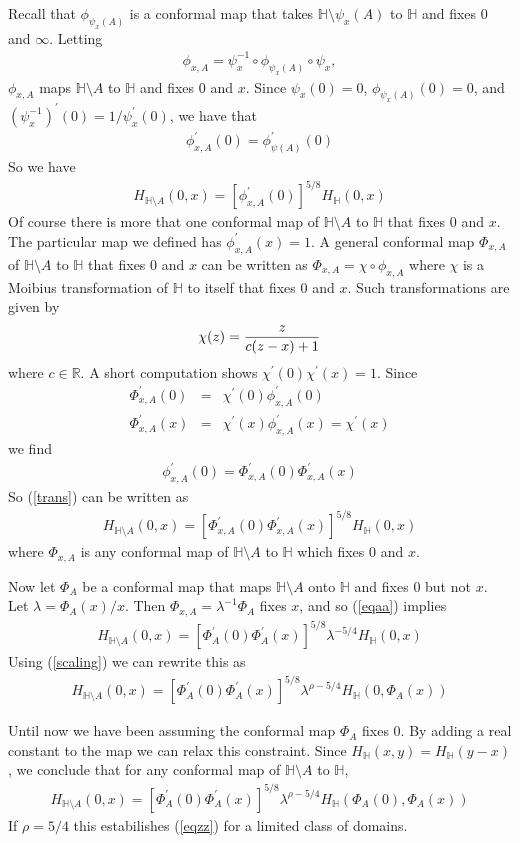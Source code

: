 \documentclass[12pt]{article}
\newcommand{\bea}{\begin{eqnarray}}
\newcommand{\eea}{\end{eqnarray}}
\newcommand{\beann}{\begin{eqnarray*}}
\newcommand{\eeann}{\end{eqnarray*}}
\def\reff#1{(\ref{#1})}
\def \Half {{\mathbb H}}
\def \reals {{\mathbb R}}
\begin{document}
Recall that $\phi_{\psi_x(A)}$ is a conformal map that takes 
$\Half \setminus \psi_x(A)$ to $\Half$ and fixes $0$ and $\infty$. 
Letting
\beann
\phi_{x,A}= \psi_x^{-1} \circ \phi_{\psi_x(A)} \circ \psi_x,
\eeann
$\phi_{x,A}$ maps $\Half \setminus A$ to $\Half$ and fixes $0$ 
and $x$. 
Since $\psi_x(0)=0$, $\phi_{\psi_x(A)}(0)=0$, and 
$(\psi_x^{-1})^\prime(0)=1/\psi_x^\prime(0)$, 
we have that 
\beann
\phi_{x,A}^\prime(0) = \phi_{\psi(A)}^\prime(0) 
\eeann
So we have
\bea
H_{\Half \setminus A} (0,x)  = [\phi_{x,A}^\prime(0)]^{5/8} H_\Half(0,x) 
\label{trans}
\eea
Of course there is more that one conformal map of $\Half \setminus A$
to $\Half$ that fixes $0$ and $x$. The particular map we defined has 
$\phi_{x,A}^\prime(x)=1$. 
A general conformal map $\Phi_{x,A}$ of $\Half \setminus A$
to $\Half$ that fixes $0$ and $x$ can be written as 
$\Phi_{x,A} = \chi \circ \phi_{x,A}$ 
where $\chi$ is a Moibius transformation of $\Half$ to itself that 
fixes $0$ and $x$. 
Such transformations are given by 
\beann 
\chi(z) = {z \over c(z-x)+1}
\eeann
where $c \in \reals$. 
A short computation shows $\chi^\prime(0) \chi^\prime(x)=1$. 
Since 
\beann
\Phi_{x,A}^\prime(0) &=& \chi^\prime(0) \phi_{x,A}^\prime(0) \\
\Phi_{x,A}^\prime(x) &=& \chi^\prime(x) \phi_{x,A}^\prime(x) = \chi^\prime(x) 
\eeann
we find
\beann
\phi_{x,A}^\prime(0) = \Phi_{x,A}^\prime(0)  \Phi_{x,A}^\prime(x)  
\eeann
So \reff{trans} can be written as 
\bea
H_{\Half \setminus A} (0,x)  = 
[\Phi_{x,A}^\prime(0) \Phi_{x,A}^\prime(x)]^{5/8} H_\Half(0,x) 
\label{eqaa}
\eea
where $\Phi_{x,A}$ is any conformal map of $\Half \setminus A$ to $\Half$ 
which fixes $0$ and $x$.


Now let $\Phi_A$ be a conformal map that maps $\Half \setminus A$
onto $\Half$ and fixes $0$ but not $x$. Let $\lambda=\Phi_A(x)/x$. 
Then $\Phi_{x,A} = \lambda^{-1} \Phi_A$ fixes $x$, and so \reff{eqaa}
implies
\beann
H_{\Half \setminus A} (0,x)  = 
[\Phi_A^\prime(0) \Phi_A^\prime(x)]^{5/8} \lambda^{-5/4} H_\Half(0,x) 
\label{eqbb}
\eeann
Using \reff{scaling} we can rewrite this as 
\bea
H_{\Half \setminus A} (0,x)  = 
[\Phi_A^\prime(0) \Phi_A^\prime(x)]^{5/8} \lambda^{\rho-5/4} 
H_\Half(0,\Phi_A(x)) 
\eea

Until now we have been assuming the conformal map $\Phi_A$ fixes $0$. 
By adding a real constant to the map we can relax this constraint. 
Since $H_\Half(x,y) = H_\Half(y-x)$, we conclude that for any 
conformal map of $\Half \setminus A$ to $\Half$, 
\bea
H_{\Half \setminus A} (0,x)  = 
[\Phi_A^\prime(0) \Phi_A^\prime(x)]^{5/8} \lambda^{\rho-5/4} 
H_\Half(\Phi_A(0),\Phi_A(x)) 
\eea
If $\rho=5/4$ this estabilishes \reff{eqzz} for a limited 
class of domains. 
\end{document}
